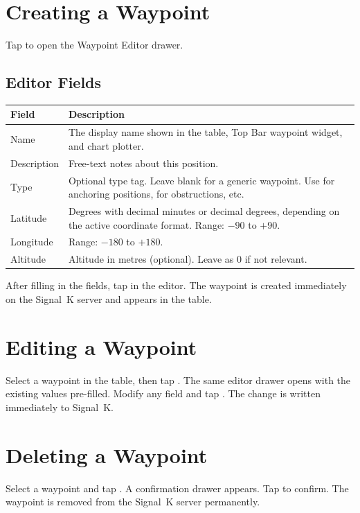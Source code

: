\section{Creating a Waypoint}

Tap  to open the Waypoint Editor drawer.


\subsection{Editor Fields}

\begin{longtable}{L{3cm} L{10.7cm}}
\toprule
{}
{\sffamily\bfseries\color{white} Field} &
{\sffamily\bfseries\color{white} Description} \\
\midrule
Name & The display name shown in the table, Top Bar waypoint widget, and chart plotter. \\
Description & Free-text notes about this position. \\
Type & Optional type tag. Leave blank for a generic waypoint. Use  for anchoring positions,  for obstructions, etc. \\
Latitude & Degrees with decimal minutes or decimal degrees, depending on the active coordinate format. Range: $-90$ to $+90$. \\
Longitude & Range: $-180$ to $+180$. \\
Altitude & Altitude in metres (optional). Leave as 0 if not relevant. \\
\bottomrule
\end{longtable}

After filling in the fields, tap  in the editor.
The waypoint is created immediately on the Signal~K server and appears in the table.

\section{Editing a Waypoint}

Select a waypoint in the table, then tap .
The same editor drawer opens with the existing values pre-filled.
Modify any field and tap .
The change is written immediately to Signal~K.

\section{Deleting a Waypoint}

Select a waypoint and tap .
A confirmation drawer appears.
Tap  to confirm.
The waypoint is removed from the Signal~K server permanently.

